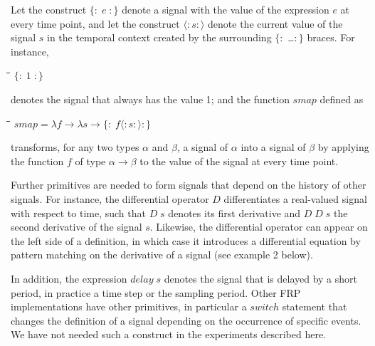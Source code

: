 \documentclass[11pt]{article}
\newlength{\lwidth}\setlength{\lwidth}{4.5cm}
\newlength{\cwidth}\setlength{\cwidth}{8mm} %
\newcommand{\Conid}[1]{\mathit{#1}}
\newcommand{\Varid}[1]{\mathit{#1}}
\begin{document}
Let the construct \ensuremath{\{\!:\!\;\Varid{e}\;\!:\!\}} denote a signal with the value of
the expression \ensuremath{\Varid{e}} at every time point, and let the construct \ensuremath{\langle:\Varid{s}:\rangle} denote the current value of the signal \ensuremath{\Varid{s}} in the temporal context
created by the surrounding \ensuremath{\{\!:\!} \ldots \ensuremath{\!:\!\}} braces. For
instance,
\begin{tabbing}
\qquad\=\hspace{\lwidth}\=\hspace{\cwidth}\=\+\kill
${\{\!:\!\;\mathrm{1}\;\!:\!\}}$
\end{tabbing}denotes the signal that always has the value 1; and the function \ensuremath{\Varid{smap}}
defined as
\begin{tabbing}
\qquad\=\hspace{\lwidth}\=\hspace{\cwidth}\=\+\kill
${\Varid{smap}\mathrel{=}\lambda \Varid{f}\to \lambda \Varid{s}\to \{\!:\!\;\Varid{f}\langle:\Varid{s}:\rangle\!:\!\}}$
\end{tabbing}transforms, for any two types \ensuremath{\alpha} and \ensuremath{\beta}, a signal of \ensuremath{\alpha}
into a signal of \ensuremath{\beta} by applying the function \ensuremath{\Varid{f}} of type \ensuremath{\alpha\to \beta} to the value of the signal at every time point.

Further primitives are needed to form signals that depend on the
history of other signals. For instance, the differential operator \ensuremath{\Conid{D}}
differentiates a real-valued signal with respect to time, such that 
\ensuremath{\Conid{D}\;\Varid{s}} denotes its first derivative and \ensuremath{\Conid{D}\;\Conid{D}\;\Varid{s}} the second derivative of the
signal \ensuremath{\Varid{s}}. Likewise, the differential operator can appear on the left
side of a definition, in which case it introduces a differential
equation by pattern matching 
on the derivative of a signal (see example 2 below).

In addition, the expression \ensuremath{\Varid{delay}\;\Varid{s}} denotes the signal that is
delayed by a short period, in practice a time step or the sampling
period. Other FRP implementations have other primitives, in particular
a \ensuremath{\Varid{switch}} statement that changes the definition of a signal depending
on the occurrence of specific events. We have not needed such a
construct in the experiments described here.
\end{document}
